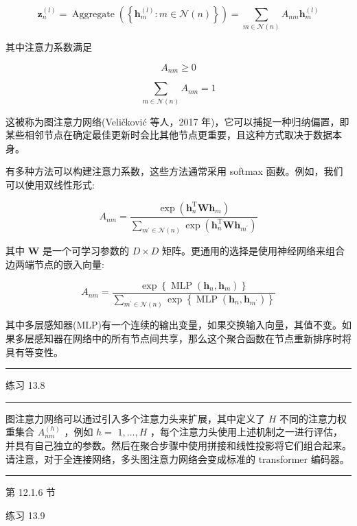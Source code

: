 \documentclass[10pt]{article}
\newcommand{\HRule}{\begin{center}\rule{0.9\linewidth}{0.2mm}\end{center}}
\begin{document}
\[
{\mathbf{z}}_{n}^{\left( l\right) } = \operatorname{Aggregate}\left( \left\{  {{\mathbf{h}}_{m}^{\left( l\right) } : m \in  \mathcal{N}\left( n\right) }\right\}  \right)  = \mathop{\sum }\limits_{{m \in  \mathcal{N}\left( n\right) }}{A}_{nm}{\mathbf{h}}_{m}^{\left( l\right) } \tag{13.24}
\]

其中注意力系数满足

\[
{A}_{nm} \geq  0 \tag{13.25}
\]

\[
\mathop{\sum }\limits_{{m \in  \mathcal{N}\left( n\right) }}{A}_{nm} = 1 \tag{13.26}
\]

这被称为图注意力网络(Veličković 等人，2017 年)，它可以捕捉一种归纳偏置，即某些相邻节点在确定最佳更新时会比其他节点更重要，且这种方式取决于数据本身。

有多种方法可以构建注意力系数，这些方法通常采用 softmax 函数。例如，我们可以使用双线性形式:

\[
{A}_{nm} = \frac{\exp \left( {{\mathbf{h}}_{n}^{\mathrm{T}}\mathbf{W}{\mathbf{h}}_{m}}\right) }{\mathop{\sum }\limits_{{{m}^{\prime } \in  \mathcal{N}\left( n\right) }}\exp \left( {{\mathbf{h}}_{n}^{\mathrm{T}}\mathbf{W}{\mathbf{h}}_{{m}^{\prime }}}\right) } \tag{13.27}
\]

其中 \(\mathbf{W}\) 是一个可学习参数的 \(D \times  D\) 矩阵。更通用的选择是使用神经网络来组合边两端节点的嵌入向量:

\[
{A}_{nm} = \frac{\exp \left\{  {\operatorname{MLP}\left( {{\mathbf{h}}_{n},{\mathbf{h}}_{m}}\right) }\right\}  }{\mathop{\sum }\limits_{{{m}^{\prime } \in  \mathcal{N}\left( n\right) }}\exp \left\{  {\operatorname{MLP}\left( {{\mathbf{h}}_{n},{\mathbf{h}}_{{m}^{\prime }}}\right) }\right\}  } \tag{13.28}
\]

其中多层感知器(MLP)有一个连续的输出变量，如果交换输入向量，其值不变。如果多层感知器在网络中的所有节点间共享，那么这个聚合函数在节点重新排序时将具有等变性。

\HRule

练习 13.8

\HRule

图注意力网络可以通过引入多个注意力头来扩展，其中定义了 \(H\) 不同的注意力权重集合 \({A}_{nm}^{\left( h\right) }\) ，例如 \(h =\)  \(1,\ldots ,H\) ，每个注意力头使用上述机制之一进行评估，并具有自己独立的参数。然后在聚合步骤中使用拼接和线性投影将它们组合起来。请注意，对于全连接网络，多头图注意力网络会变成标准的 transformer 编码器。

\HRule

第 12.1.6 节

练习 13.9
\end{document}
